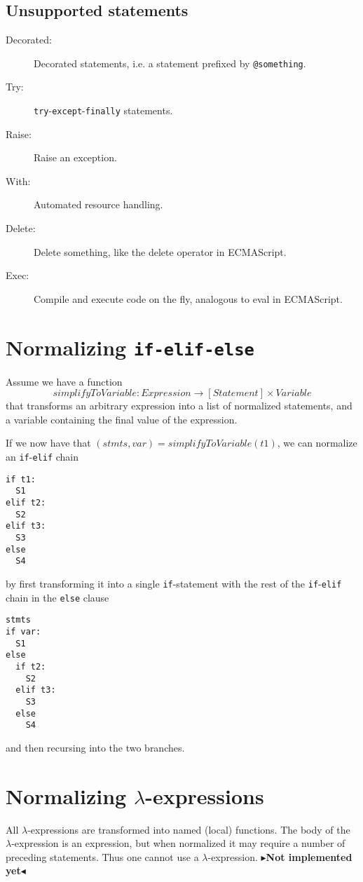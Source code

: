 \documentclass[11pt]{report}
\newcommand{\todo}[1]{{\color[rgb]{.5,0,0}\textbf{$\blacktriangleright$#1$\blacktriangleleft$}}}
\begin{document}
\subsection{Unsupported statements}
\begin{description}
  \item[Decorated:] Decorated statements, i.e. a statement prefixed by \verb|@something|.
  \item[Try:] \verb|try|-\verb|except|-\verb|finally| statements.
  \item[Raise:] Raise an exception.
  \item[With:] Automated resource handling.
  \item[Delete:] Delete something, like the delete operator in
    ECMAScript.
  \item[Exec:] Compile and execute code on the fly, analogous to eval
    in ECMAScript.
\end{description}

\section{Normalizing {\tt if-elif-else}}
Assume we have a function $$simplifyToVariable: Expression \rightarrow
[Statement] \times Variable$$ that transforms an arbitrary expression
into a list of normalized statements, and a variable containing the
final value of the expression.

If we now have that $(stmts, var) = simplifyToVariable(t1)$, we can
normalize an \verb!if!-\verb!elif! chain
\begin{verbatim}
if t1:
  S1
elif t2:
  S2
elif t3:
  S3
else
  S4
\end{verbatim}
by first transforming it into a single \verb!if!-statement with the rest of the
\verb!if!-\verb!elif! chain in the \verb!else! clause
\begin{verbatim}
stmts
if var:
  S1
else
  if t2:
    S2
  elif t3:
    S3
  else
    S4
\end{verbatim}
and then recursing into the two branches.

\section{Normalizing $\lambda$-expressions}
All $\lambda$-expressions are transformed into named (local) functions. The body
of the $\lambda$-expression is an expression, but when normalized it may require
a number of preceding statements. Thus one cannot use a $\lambda$-expression.
\todo{Not implemented yet}
\end{document}
